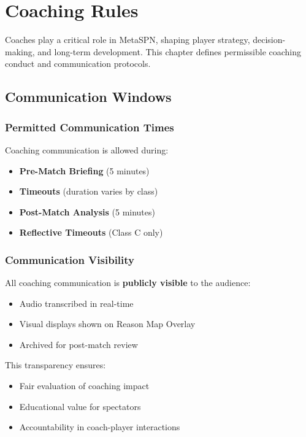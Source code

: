 \chapter{Coaching Rules}
\label{ch:coaching}

Coaches play a critical role in MetaSPN, shaping player strategy, decision-making, and long-term development. This chapter defines permissible coaching conduct and communication protocols.

\section{Communication Windows}

\subsection{Permitted Communication Times}

Coaching communication is allowed during:
\begin{itemize}[leftmargin=*]
  \item \textbf{Pre-Match Briefing} (5 minutes)
  \item \textbf{Timeouts} (duration varies by class)
  \item \textbf{Post-Match Analysis} (5 minutes)
  \item \textbf{Reflective Timeouts} (Class C only)
\end{itemize}

\subsection{Communication Visibility}

All coaching communication is \textbf{publicly visible} to the audience:
\begin{itemize}[leftmargin=*]
  \item Audio transcribed in real-time
  \item Visual displays shown on Reason Map Overlay
  \item Archived for post-match review
\end{itemize}

This transparency ensures:
\begin{itemize}[leftmargin=*]
  \item Fair evaluation of coaching impact
  \item Educational value for spectators
  \item Accountability in coach-player interactions
\end{itemize}

